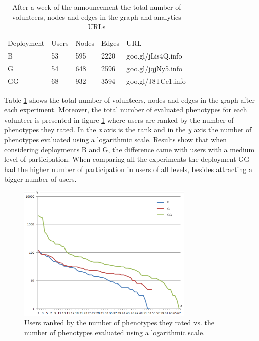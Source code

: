 \begin{table}
  \small
  \caption{After a week of the announcement the total number of volunteers, 
  nodes and edges in the graph and analytics URLs}
  \label{tab:urls} 
  \centering
  \small
  \begin{tabular}{l l l l l}
    \hline\noalign{\smallskip}
     Deployment &  Users &  Nodes &  Edges & URL \\
    \noalign{\smallskip}\hline\noalign{\smallskip}
    B   & 53 &  595   & 2220  & goo.gl/jLis4Q.info \\ \hline
    G   & 54 &  648   & 2596  & goo.gl/jqjNy5.info \\ \hline
    GG  & 68 &  932   & 3594  & goo.gl/J8TCe1.info \\ \hline
    \end{tabular}
\end{table}

Table \ref{tab:urls} shows the total number of volunteers, nodes and edges 
in the graph after each experiment. Moreover, the total number of evaluated 
phenotypes for each volunteer is presented in figure 
\ref{fig:top-ranked-participation} where users are ranked by the 
number of phenotypes they rated. In the \emph{x} axis is the rank and in the \emph{y} axis 
the number of phenotypes evaluated using a logarithmic scale. Results show that when 
considering deployments B and G, the difference came with users with a medium level of participation.
When comparing all the experiments the deployment GG had the higher
number of participation in users of all levels, besides attracting a
bigger number of users.    

\begin{figure}[!t]
    \centering
        \includegraphics[width=3.3in]{img/comparison.png}
    \caption{Users ranked by the number of phenotypes they 
    rated vs. the number of phenotypes evaluated using a logarithmic scale. }
    \label{fig:top-ranked-participation}
\end{figure}

